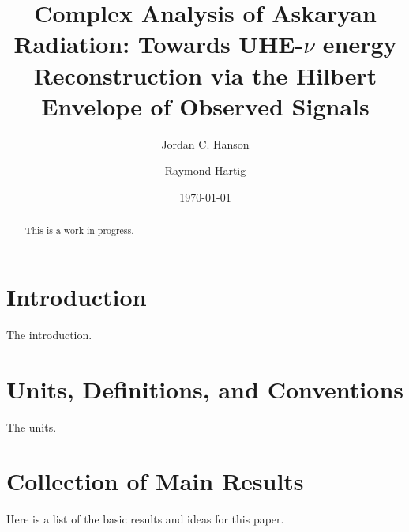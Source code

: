 \documentclass[amsmath,amssymb,aps,prd,10pt,twocolumn,showkeys]{revtex4}
\begin{document}
\title{Complex Analysis of Askaryan Radiation: Towards UHE-$\nu$ energy Reconstruction via the Hilbert Envelope of Observed Signals}

\author{Jordan C. Hanson}
\author{Raymond Hartig}
\date{\today}

\begin{abstract}
This is a work in progress.
\end{abstract}


\maketitle

\section{Introduction}

The introduction.

\section{Units, Definitions, and Conventions}
\label{sec:unit}

The units.

\section{Collection of Main Results}
\label{sec:onc}

Here is a list of the basic results and ideas for this paper.
\end{document}
